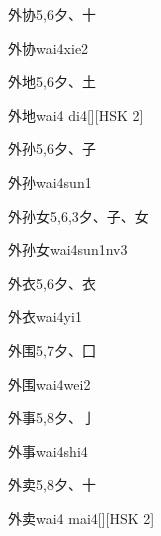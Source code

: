 \begin{entry}{外协}{5,6}{⼣、⼗}
  \begin{phonetics}{外协}{wai4xie2}
  \end{phonetics}
\end{entry}

\begin{entry}{外地}{5,6}{⼣、⼟}
  \begin{phonetics}{外地}{wai4 di4}[][HSK 2]
  \end{phonetics}
\end{entry}

\begin{entry}{外孙}{5,6}{⼣、⼦}
  \begin{phonetics}{外孙}{wai4sun1}
  \end{phonetics}
\end{entry}

\begin{entry}{外孙女}{5,6,3}{⼣、⼦、⼥}
  \begin{phonetics}{外孙女}{wai4sun1nv3}
  \end{phonetics}
\end{entry}

\begin{entry}{外衣}{5,6}{⼣、⾐}
  \begin{phonetics}{外衣}{wai4yi1}
  \end{phonetics}
\end{entry}

\begin{entry}{外围}{5,7}{⼣、⼞}
  \begin{phonetics}{外围}{wai4wei2}
  \end{phonetics}
\end{entry}

\begin{entry}{外事}{5,8}{⼣、⼅}
  \begin{phonetics}{外事}{wai4shi4}
  \end{phonetics}
\end{entry}

\begin{entry}{外卖}{5,8}{⼣、⼗}
  \begin{phonetics}{外卖}{wai4 mai4}[][HSK 2]
  \end{phonetics}
\end{entry}


